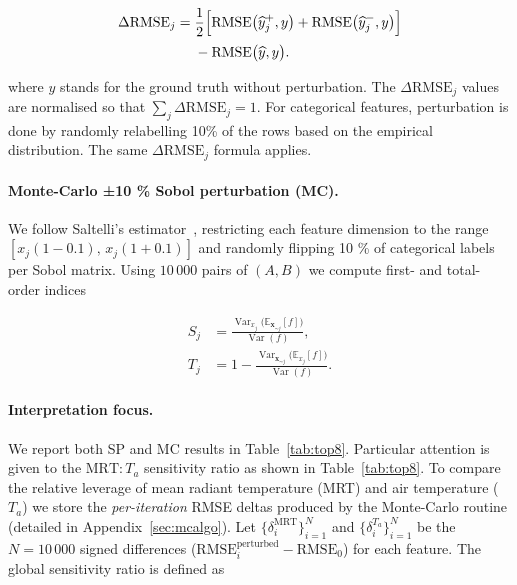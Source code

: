 \documentclass{article}
\theoremstyle{plain}
\theoremstyle{definition}
\theoremstyle{remark}
\begin{document}
\begin{align}
\Delta\text{RMSE}_{j} =\;&
\frac{1}{2}\Bigl[
      \operatorname{RMSE}\bigl(\widehat{y}_{j}^{+},y\bigr)
   +  \operatorname{RMSE}\bigl(\widehat{y}_{j}^{-},y\bigr)
\Bigr]                                        \nonumber\\[2pt]
&- \operatorname{RMSE}\bigl(\widehat{y},y\bigr).
\label{eq:delta_rmse}
\end{align}

where \( y \) stands for the ground truth without perturbation. The \(\Delta\text{RMSE}_{j}\) values are normalised so that \(\sum_{j}\Delta\text{RMSE}_{j}=1\).
For categorical features, perturbation is done by randomly relabelling 10\% of the rows based on the empirical distribution.   
The same $\Delta\text{RMSE}_{j}$ formula applies.

\paragraph{Monte-Carlo ±10 \% Sobol perturbation (MC).}
We follow Saltelli’s estimator~\cite{saltelli2010variance}, restricting each feature dimension to the range \([x_{j}(1-0.1),\,x_{j}(1+0.1)]\) and randomly flipping 10 \% of categorical labels  
per Sobol matrix.  
Using \(10\,000\) pairs of \((A,B)\) we compute first- and total-order indices  

\begin{align}
S_{j} &= \frac{\operatorname{Var}_{x_{j}}\!\bigl(\mathbb{E}_{\mathbf{x}_{\sim j}}[f]\bigr)}{\operatorname{Var}(f)}, \label{eq:Sj_alt} \\
T_{j} &= 1-\frac{\operatorname{Var}_{\mathbf{x}_{\sim j}}\!\bigl(\mathbb{E}_{x_{j}}[f]\bigr)}{\operatorname{Var}(f)}. \label{eq:Tj_alt}
\end{align}


\paragraph{Interpretation focus.}\label{ssec:mrt_ratio}
We report both SP and MC results in Table~\ref{tab:top8}. Particular attention is given to the \(\text{MRT}:T_{a}\) sensitivity ratio as shown in Table~\ref{tab:top8}. To compare the relative leverage of mean radiant temperature (MRT) and air temperature ($T_a$) we store the \textit{per-iteration} RMSE deltas produced by the Monte-Carlo routine (detailed in Appendix~\ref{sec:mcalgo}).  Let $\{\delta_i^{\text{MRT}}\}_{i=1}^{N}$ and $\{\delta_i^{T_a}\}_{i=1}^{N}$ be the $N{=}10\,000$ signed differences ($\text{RMSE}_i^{\text{perturbed}}-\text{RMSE}_0$) for each feature. The global sensitivity ratio is defined as
\end{document}
